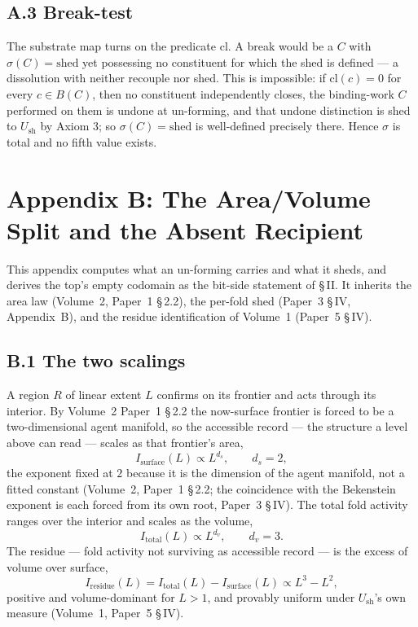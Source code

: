 \documentclass[11pt,oneside]{report}
\theoremstyle{definition}
\theoremstyle{remark}
\begin{document}
\subsection*{A.3 Break-test}

The substrate map turns on the predicate \ensuremath{\mathrm{cl}}. A break would be a \ensuremath{C}
with \ensuremath{\sigma(C) = \text{shed}} yet possessing no constituent for which the shed is defined
--- a dissolution with neither recouple nor shed. This is impossible: if \ensuremath{\mathrm{cl}(c) = 0}
for every \ensuremath{c \in B(C)}, then no constituent independently closes, the binding-work
\ensuremath{C} performed on them is undone at un-forming, and that undone distinction is shed to
\ensuremath{U_{\mathrm{sh}}} by Axiom 3; so \ensuremath{\sigma(C) = \text{shed}} is well-defined
precisely there. Hence \ensuremath{\sigma} is total and no fifth value exists.

\section*{Appendix B: The Area/Volume Split and the Absent Recipient}

This appendix computes what an un-forming carries and what it sheds, and derives the top's empty
codomain as the bit-side statement of \S\,II. It inherits the area law (Volume~2, Paper~1 \S\,2.2),
the per-fold shed (Paper~3 \S\,IV, Appendix~B), and the residue identification of Volume~1
(Paper~5 \S\,IV).

\subsection*{B.1 The two scalings}

A region \ensuremath{R} of linear extent \ensuremath{L} confirms on its frontier and acts through its
interior. By Volume~2 Paper~1 \S\,2.2 the now-surface frontier is forced to be a two-dimensional
agent manifold, so the accessible record --- the structure a level above can read --- scales as that
frontier's area,
\[
  I_{\mathrm{surface}}(L) \propto L^{d_s}, \qquad d_s = 2,
\]
the exponent fixed at \ensuremath{2} because it is the dimension of the agent manifold, not a fitted
constant (Volume~2, Paper~1 \S\,2.2; the coincidence with the Bekenstein exponent is each forced
from its own root, Paper~3 \S\,IV). The total fold activity ranges over the interior and scales as
the volume,
\[
  I_{\mathrm{total}}(L) \propto L^{d_v}, \qquad d_v = 3.
\]
The residue --- fold activity not surviving as accessible record --- is the excess of volume over
surface,
\[
  I_{\mathrm{residue}}(L) = I_{\mathrm{total}}(L) - I_{\mathrm{surface}}(L) \propto L^3 - L^2,
\]
positive and volume-dominant for \ensuremath{L > 1}, and provably uniform under
\ensuremath{U_{\mathrm{sh}}}'s own measure (Volume~1, Paper~5 \S\,IV).
\end{document}
